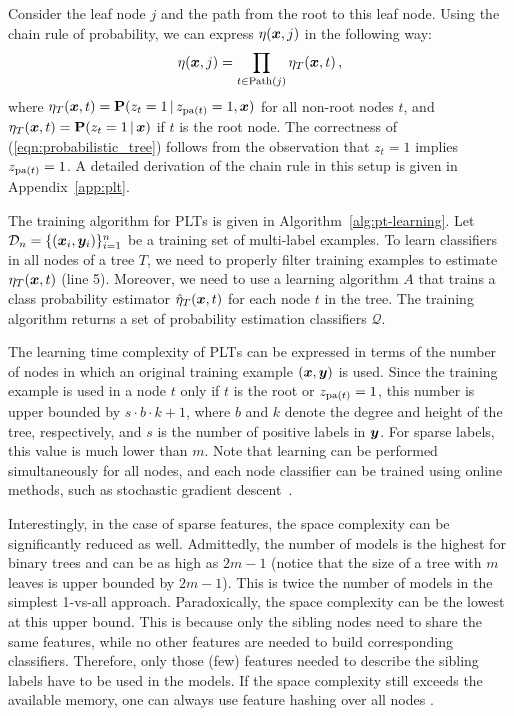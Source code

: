 \documentclass{article}
\newcommand{\cD}{\mathcal{D}}
\newcommand{\prob}{\mathbf{P}}
\newcommand{\Algo}[1]{\textsc{#1}}
\begin{document}
Consider the leaf node $j$ and the path from the root to this leaf node. Using the chain rule of probability, we can express $\eta(\boldsymbol{x}, j)$ in the following way:
\begin{equation}
\eta(\boldsymbol{x}, j) = \prod_{t \in \mathrm{Path}(j)} \eta_T(\boldsymbol{x}, t)\,,
\label{eqn:probabilistic_tree}
\end{equation}
where $\eta_T(\bx, t) = \prob(z_t = 1 \given z_{\pa{t}} =1, \bx)$ for all non-root nodes $t$, and $\eta_T(\bx, t) = \prob(z_t = 1 \given \bx)$ if $t$ is the root node. 
The correctness of (\ref{eqn:probabilistic_tree}) follows from the observation that $z_{t} = 1$ implies $z_{\mathrm{pa}(t)} = 1$. A detailed derivation of the chain rule in this setup is given in Appendix~\ref{app:plt}.


The training algorithm for \Algo{PLT}s is given in Algorithm~\ref{alg:pt-learning}.
Let $\cD_n = \{ (\bx_i, \by_{i}) \}_{i=1}^n$ be a training set of multi-label examples.
To learn classifiers in all nodes of a tree $T$, we need to properly filter training examples to estimate $\eta_T(\boldsymbol{x},t)$ (line 5). Moreover, we need to use a learning algorithm $A$ that trains a class probability estimator $\hat{\eta}_T(\boldsymbol{x},t)$ for each node $t$ in the tree. %
The training algorithm returns a set of probability estimation classifiers $\mathcal{Q}$.

The learning time complexity of \Algo{PLT}s can be expressed in terms of the number of nodes in which an original training example $(\boldsymbol{x},\boldsymbol{y})$ is used. Since the training example is used in a node $t$ only if $t$ is the root or $z_{\mathrm{pa}(t)} = 1$, this number is upper bounded by $s\cdot b \cdot k+1$, where $b$ and $k$ denote the degree and height of the tree, respectively, and $s$ is the number of positive labels in $\boldsymbol{y}$. For sparse labels, this value is much lower than $m$. Note that learning can be performed simultaneously for all nodes, and each node classifier can be trained using online methods, such as stochastic gradient descent~\cite{Bottou_2010}.

Interestingly, in the case of sparse features, the space complexity can be significantly reduced as well. Admittedly, the number of models is the highest for binary trees and can be as high as $2m-1$ (notice that the size of a tree with $m$ leaves is upper bounded by $2m-1$). This is twice the number of models in the simplest 1-vs-all approach. Paradoxically, the space complexity can be the lowest at this upper bound. This is because only the sibling nodes need to share the same features, while no other features are needed to build corresponding classifiers. Therefore, only those (few) features needed to describe the sibling labels have to be used in the models. If the space complexity still exceeds the available memory, one can always use feature hashing over all nodes \cite{Weinberger_et_al_2009}.
\end{document}
